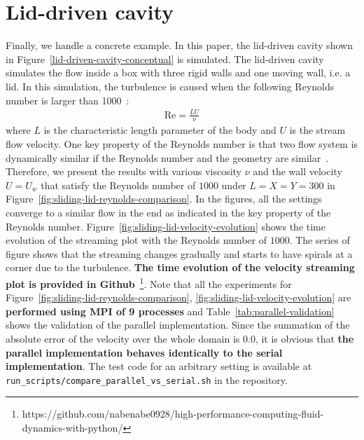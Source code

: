 \section{Lid-driven cavity}
Finally, we handle a concrete example.
In this paper, the lid-driven cavity shown in Figure~\ref{lid-driven-cavity-conceptual} is simulated.
The lid-driven cavity simulates the flow inside a box with
three rigid walls and one moving wall, i.e. a lid.
In this simulation, the turbulence is caused 
when the following Reynolds number is larger than 1000~\cite{chiang1998effect}:
\begin{equation}
\begin{aligned}
  \text{Re} = \frac{LU}{\nu}
\end{aligned}
\end{equation}
where $L$ is the characteristic length parameter
of the body and $U$ is the stream flow velocity.
One key property of the Reynolds number is that two flow system
is dynamically similar if the Reynolds number and the geometry are similar~\cite{kundu2008fluid}.
Therefore, we present the results with various 
viscosity $\nu$ and the wall velocity $U = U_w$ that 
satisfy the Reynolds number of $1000$ under $L = X = Y = 300$
in Figure~\ref{fig:sliding-lid-reynolds-comparison}.
In the figures, all the settings converge to a similar flow in the end
as indicated in the key property of the Reynolds number.
Figure~\ref{fig:sliding-lid-velocity-evolution} shows the time evolution of
the streaming plot with the Reynolds number of $1000$.
The series of figure shows that the streaming changes gradually
and starts to have spirals at a corner due to the turbulence.
{\bf The time evolution of the velocity streaming plot is provided in
Github}~\footnote{https://github.com/nabenabe0928/high-performance-computing-fluid-dynamics-with-python/}.
Note that all the experiments for
Figure~\ref{fig:sliding-lid-reynolds-comparison}, \ref{fig:sliding-lid-velocity-evolution}
are {\bf performed using MPI of 9 processes}
and Table~\ref{tab:parallel-validation}
shows the validation of the parallel implementation.
Since the summation of the absolute error of the velocity over the whole domain
is $0.0$, it is obvious that
{\bf the parallel implementation behaves identically to the serial implementation}.
The test code for an arbitrary setting is available at {\tt run\_scripts/compare\_parallel\_vs\_serial.sh}
in the repository.

